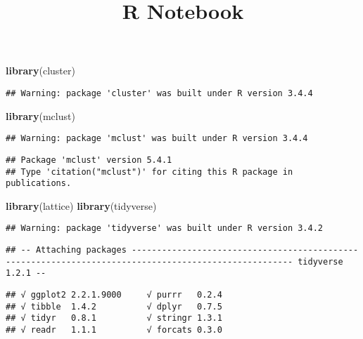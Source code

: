 \documentclass[]{article}
\title{R Notebook}
\author{}
\date{}
\newenvironment{Shaded}{\begin{snugshade}}{\end{snugshade}}
\newcommand{\KeywordTok}[1]{\textcolor[rgb]{0.13,0.29,0.53}{\textbf{#1}}}
\newcommand{\NormalTok}[1]{#1}
\begin{document}
\maketitle

\begin{Shaded}
\begin{Highlighting}[]
\KeywordTok{library}\NormalTok{(cluster)}
\end{Highlighting}
\end{Shaded}

\begin{verbatim}
## Warning: package 'cluster' was built under R version 3.4.4
\end{verbatim}

\begin{Shaded}
\begin{Highlighting}[]
\KeywordTok{library}\NormalTok{(mclust)}
\end{Highlighting}
\end{Shaded}

\begin{verbatim}
## Warning: package 'mclust' was built under R version 3.4.4
\end{verbatim}

\begin{verbatim}
## Package 'mclust' version 5.4.1
## Type 'citation("mclust")' for citing this R package in publications.
\end{verbatim}

\begin{Shaded}
\begin{Highlighting}[]
\KeywordTok{library}\NormalTok{(lattice)}
\KeywordTok{library}\NormalTok{(tidyverse)}
\end{Highlighting}
\end{Shaded}

\begin{verbatim}
## Warning: package 'tidyverse' was built under R version 3.4.2
\end{verbatim}

\begin{verbatim}
## -- Attaching packages ------------------------------------------------------------------------------------------------------ tidyverse 1.2.1 --
\end{verbatim}

\begin{verbatim}
## √ ggplot2 2.2.1.9000     √ purrr   0.2.4     
## √ tibble  1.4.2          √ dplyr   0.7.5     
## √ tidyr   0.8.1          √ stringr 1.3.1     
## √ readr   1.1.1          √ forcats 0.3.0
\end{verbatim}
\end{document}
